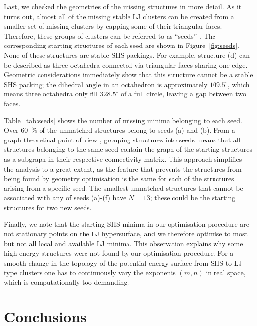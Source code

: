 Last, we checked the geometries of the missing structures in more detail.
As it turns out, almost all of the missing stable LJ clusters can be created
from a smaller set of missing clusters by capping some of their triangular
faces. Therefore, these groups of clusters can be referred to as ``seeds''
\autocite{Arkus_DerivingFiniteSphere_2011}. The corresponding starting structures of each seed
are shown in Figure~\ref{fig:seeds}. 
None of these structures are stable SHS packings. For
example, structure (d) can be described as three octahedra connected via
triangular faces sharing one edge. Geometric considerations \autocite{Arkus_DerivingFiniteSphere_2011,Hoy_Structurefinitesphere_2012} immediately show
that this structure cannot be a stable SHS packing;
the dihedral angle in an octahedron is approximately $109.5^\circ$, which means three
octahedra only fill $328.5^\circ$ of a full circle, leaving a gap between two
faces. 


Table~\ref{tab:seeds} shows the number of missing minima belonging to each seed.
Over 60~\% of the unmatched structures belong to seeds (a) and (b).  
From a graph theoretical point of view \autocite{Arkus_Minimalenergyclusters_2009,Arkus_DerivingFiniteSphere_2011},
grouping structures into seeds means that all structures belonging to the same
seed contain the graph of the starting structures as a subgraph in their
respective connectivity matrix.  This approach simplifies the analysis to a
great extent, as the feature that prevents the structures from being found by
geometry optimisation is the same for each of the structures arising from a
specific seed.  
The smallest unmatched structures that cannot be associated with any of seeds (a)-(f) have $N=13$;
these could be the starting structures for two new seeds.


Finally, we note that the starting SHS minima in our optimisation procedure are
not stationary points on the LJ hypersurface, and we therefore optimise to most
but not all local and available LJ minima. This observation explains why some high-energy
structures were not found by our optimisation procedure. For a smooth change in the topology of the potential energy surface
from SHS to LJ type clusters one has to continuously vary the exponents $(m,n)$
in real space, which is computationally too demanding.

\section{Conclusions}

